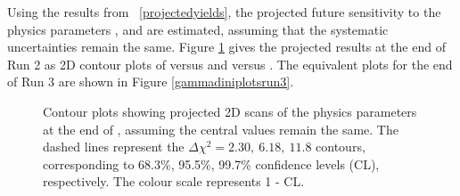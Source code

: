 
Using the results from \tab~\ref{projectedyields}, the projected future sensitivity to the physics parameters \rb, \deltab and \Pgamma are estimated, assuming that the systematic uncertainties remain the same. Figure \ref{gammadiniplotsrun2} gives the projected results at the end of Run 2 as 2D contour plots of \rb versus \Pgamma and \deltab versus \Pgamma. The equivalent plots for the end of Run 3 are shown in Figure \ref{gammadiniplotsrun3}. 

\begin{figure}[h]
\centering
{}
\caption{Contour plots showing projected 2D scans of the physics parameters at the end of \runtwo, assuming the central values remain the same. The dashed lines represent the $\Delta \chi^2 = 2.30,\ 6.18,\ 11.8$ contours, corresponding to 68.3\%, 95.5\%, 99.7\% confidence levels (CL), respectively. The colour scale represents 1 - CL.}
\label{gammadiniplotsrun2}
\end{figure}

